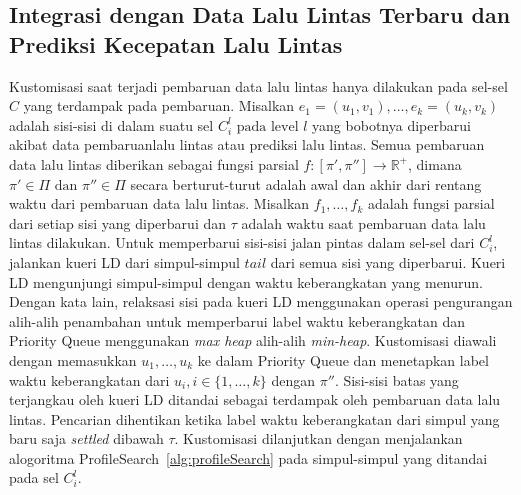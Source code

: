 \subsection{Integrasi dengan Data Lalu Lintas Terbaru dan Prediksi Kecepatan Lalu Lintas}
\label{subsec:tdcrp-traffic-update}
Kustomisasi saat terjadi pembaruan data lalu lintas hanya dilakukan pada sel-sel $C$ yang terdampak pada pembaruan. Misalkan $e_1=(u_1,v_1),\ldots,e_k=(u_k,v_k)$ adalah sisi-sisi di dalam suatu sel $C_i^l \text{ pada level }l$ yang bobotnya diperbarui akibat data pembaruanlalu lintas atau prediksi lalu lintas. Semua pembaruan data lalu lintas diberikan sebagai fungsi parsial $f:[\pi',\pi'']\rightarrow \mathbb{R}^+$, dimana $\pi'\in \Pi \text{ dan }\pi''\in \Pi$ secara berturut-turut adalah awal dan akhir dari rentang waktu dari pembaruan data lalu lintas. Misalkan $f_1,\ldots,f_k$ adalah fungsi parsial dari setiap sisi yang diperbarui dan $\tau$ adalah waktu saat pembaruan data lalu lintas dilakukan. Untuk memperbarui sisi-sisi jalan pintas dalam sel-sel dari $C_i^l$, jalankan kueri LD dari simpul-simpul $tail$ dari semua sisi yang diperbarui. Kueri LD mengunjungi simpul-simpul dengan waktu keberangkatan yang menurun. Dengan kata lain, relaksasi sisi pada kueri LD menggunakan operasi pengurangan alih-alih penambahan untuk memperbarui label waktu keberangkatan dan Priority Queue menggunakan \textit{max heap} alih-alih \textit{min-heap}. Kustomisasi diawali dengan memasukkan $u_1,\ldots,u_k$ ke dalam Priority Queue dan menetapkan label waktu keberangkatan dari $u_i,i\in\{1,\ldots,k\}$ dengan $\pi''$. Sisi-sisi batas yang terjangkau oleh kueri LD ditandai sebagai terdampak oleh pembaruan data lalu lintas. Pencarian dihentikan ketika label waktu keberangkatan dari simpul yang baru saja \textit{settled} dibawah $\tau$. Kustomisasi dilanjutkan dengan menjalankan alogoritma ProfileSearch~\ref{alg:profileSearch} pada simpul-simpul yang ditandai pada sel $C_i^l$.

